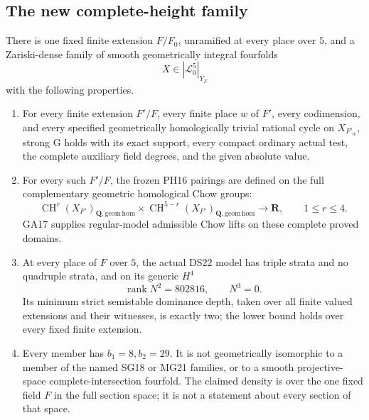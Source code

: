 \subsection{The new complete-height family}

\begin{theorem}
\label{r22dg:main}
There is one fixed finite extension $F/F_0$, unramified at every
place over $5$, and a Zariski-dense family of smooth geometrically
integral fourfolds
\[
                              X\in|\mathcal L_0^5|_{Y_F}
 \tag{DG22.4}\label{r22dg:family}
\]
with the following properties.
\begin{enumerate}
\item For every finite extension $F'/F$, every finite place $w$ of
$F'$, every codimension, and every specified geometrically
homologically trivial rational cycle on $X_{F'_w}$, strong G holds
with its exact support, every compact ordinary actual test, the
complete auxiliary field degrees, and the given absolute value.
\item For every such $F'/F$, the frozen PH16 pairings are defined
on the full complementary geometric homological Chow groups:
\[
 \operatorname{CH}^r(X_{F'})_{\mathbf Q,\mathrm{geom\,hom}}
 \times\operatorname{CH}^{5-r}(X_{F'})_{\mathbf Q,\mathrm{geom\,hom}}
                    \longrightarrow\mathbf R,\qquad1\le r\le4.
 \tag{DG22.5}\label{r22dg:heights}
\]
GA17 supplies regular-model admissible Chow lifts on these complete
proved domains.
\item At every place of $F$ over $5$, the actual DS22 model has
triple strata and no quadruple strata, and on its generic $H^4$
\[
                  \operatorname{rank}N^2=802816,\qquad N^3=0.
 \tag{DG22.6}\label{r22dg:N}
\]
Its minimum strict semistable dominance depth, taken over all
finite valued extensions and their witnesses, is exactly two;
the lower bound holds over every fixed finite extension.
\item Every member has $b_1=8,b_2=29$.  It is not geometrically
isomorphic to a member of the named SG18 or MG21 families, or to a
smooth projective-space complete-intersection fourfold.  The claimed
density is over the one fixed field $F$ in the full section space;
it is not a statement about every section of that space.
\end{enumerate}
\end{theorem}

